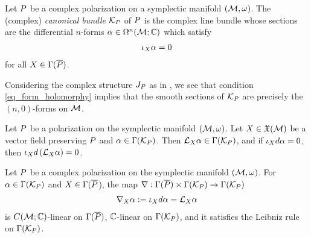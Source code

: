 \documentclass[notas.tex]{subfiles}
\begin{document}
\begin{defn}
	Let $P$ be a complex polarization on a symplectic manifold $(\mathcal{M}, \omega)$. The (complex) \emph{canonical bundle} $\mathcal{K}_P$ of $P$ is the complex line bundle whose sections are the differential $n$-forms $\alpha \in \Omega^n(\mathcal{M}; \mathbb{C})$ which satisfy
	\begin{align}\label{eq_form_holomorphy}
		\iota_{X}\alpha = 0
	\end{align}
	for all $X \in \Gamma(\overline {P})$.
\end{defn}
\begin{rem} \label{rem_kbund_quotient}
	Considering the complex structure $J_P$ as in , we see that  condition \eqref{eq_form_holomorphy} implies that the smooth sections of $\mathcal{K}_P$ are precisely the $(n,0)$-forms on $\mathcal{M}$.
\end{rem}

\begin{prop} \label{prop_lied_preservation}
	Let $P$ be a polarization on the symplectic manifold $(\mathcal{M},\omega)$. Let $X \in \mathfrak{X}(\mathcal{M})$ be a vector field preserving $P$ and $\alpha \in \Gamma(\mathcal{K}_P)$. Then $\mathcal{L}_{X}\alpha \in \Gamma(\mathcal{K}_P)$, and if $\iota_{X}d \alpha = 0$, then $\iota_{X}d \left( \mathcal{L}_{X} \alpha \right) = 0$.
\end{prop}
\begin{prop} \label{prop_kbund_pc}
	Let $P$ be a complex polarization on the symplectic manifold $(\mathcal{M},\omega)$. For $\alpha \in \Gamma(\mathcal{K}_P)$ and $X \in \Gamma(\overline {P}$), the map $\nabla : \Gamma(\overline {P}) \times \Gamma(\mathcal{K}_P) \to \Gamma(\mathcal{K}_P)$
	\begin{align}\label{eq_partial_connection}
		\nabla_{X}\alpha := \iota_{X}d \alpha = \mathcal{L}_{X} \alpha
	\end{align}
	is $C(\mathcal{M}; \mathbb{C})$-linear on $\Gamma(\overline {P})$, $\mathbb{C}$-linear on $\Gamma(\mathcal{K}_P)$, and it satisfies the Leibniz rule on $\Gamma(\mathcal{K}_P)$.
\end{prop}
\end{document}
